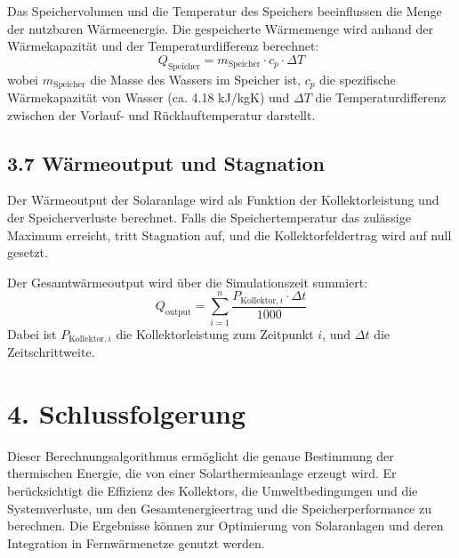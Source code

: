 \documentclass{article}
\begin{document}
Das Speichervolumen und die Temperatur des Speichers beeinflussen die Menge der nutzbaren Wärmeenergie. Die gespeicherte Wärmemenge wird anhand der Wärmekapazität und der Temperaturdifferenz berechnet:
\[
Q_{\text{Speicher}} = m_{\text{Speicher}} \cdot c_p \cdot \Delta T
\]
wobei \( m_{\text{Speicher}} \) die Masse des Wassers im Speicher ist, \( c_p \) die spezifische Wärmekapazität von Wasser (ca. 4.18 kJ/kgK) und \( \Delta T \) die Temperaturdifferenz zwischen der Vorlauf- und Rücklauftemperatur darstellt.

\subsection*{3.7 Wärmeoutput und Stagnation}

Der Wärmeoutput der Solaranlage wird als Funktion der Kollektorleistung und der Speicherverluste berechnet. Falls die Speichertemperatur das zulässige Maximum erreicht, tritt Stagnation auf, und die Kollektorfeldertrag wird auf null gesetzt.

Der Gesamtwärmeoutput wird über die Simulationszeit summiert:
\[
Q_{\text{output}} = \sum_{i=1}^{n} \frac{P_{\text{Kollektor},i} \cdot \Delta t}{1000}
\]
Dabei ist \( P_{\text{Kollektor},i} \) die Kollektorleistung zum Zeitpunkt \( i \), und \( \Delta t \) die Zeitschrittweite.

\section*{4. Schlussfolgerung}

Dieser Berechnungsalgorithmus ermöglicht die genaue Bestimmung der thermischen Energie, die von einer Solarthermieanlage erzeugt wird. Er berücksichtigt die Effizienz des Kollektors, die Umweltbedingungen und die Systemverluste, um den Gesamtenergieertrag und die Speicherperformance zu berechnen. Die Ergebnisse können zur Optimierung von Solaranlagen und deren Integration in Fernwärmenetze genutzt werden.
\end{document}
